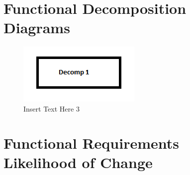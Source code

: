 \documentclass [11pt]{article}
\begin{document}
\section{Functional Decomposition Diagrams}
\begin{figure} [h!]
	\centering
	\includegraphics [scale =1] {figures/decomp_1.png}
	\caption{Insert Text Here 3}
\end{figure}


\section{Functional Requirements Likelihood of Change} \label{sec:changeL}
\end{document}

